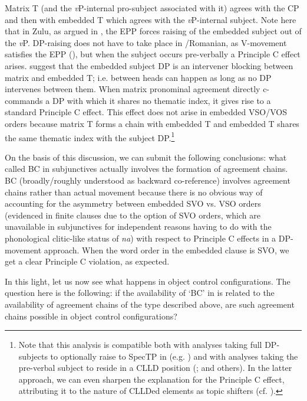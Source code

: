\documentclass[output=paper]{langsci/langscibook}
\begin{document}
Matrix T (and the \textit{v}P-internal pro-subject associated with it) agrees with the CP and then with embedded T which agrees with the \textit{v}P-internal subject. Note here that in Zulu, as argued in \citet{Halpert2016}, the EPP forces raising of the embedded subject out of the \textit{v}P. DP-raising does not have to take place in \slash Romanian, as V-movement satisfies the EPP (\citealt{Alexiadou1998}), but when the subject occurs pre-verbally a Principle C effect arises. \citet{Tsakali2017} suggest that the embedded subject DP is an intervener blocking  between matrix and embedded T; i.e.  between heads can happen as long as no DP intervenes between them. When matrix pronominal agreement directly c-commands a DP with which it shares no thematic index, it gives rise to a standard Principle C effect. This effect does not arise in embedded VSO\slash VOS orders because matrix T forms a chain with embedded T and embedded T shares the same thematic index with the subject DP.\footnote{Note that this analysis is compatible both with analyses taking full DP-subjects to optionally raise to SpecTP in  (e.g. \citealt{Spyropoulos2009}) and with analyses taking the pre-verbal subject to reside in a CLLD position (\citealt{Alexiadou1998}; \citealt{Barbosa2009} and others). In the latter approach, we can even sharpen the explanation for the Principle C effect, attributing it to the nature of CLLDed elements as topic shifters (cf. \citealt{Frascarelli2007}).}   

On the basis of this discussion, we can submit the following conclusions: what \citet{Alexiadou2010} called BC in subjunctives actually involves the formation of agreement chains. BC (broadly\slash roughly understood as backward co-reference) involves agreement chains rather than actual movement because there is no obvious way of accounting for the asymmetry between embedded SVO vs. VSO orders (evidenced in finite clauses due to the option of SVO orders, which are unavailable in subjunctives for independent reasons having to do with the phonological clitic-like status of \textit{na}) with respect to Principle C effects in a DP-movement approach. When the word order in the embedded clause is SVO, we get a clear Principle C violation, as expected.

In this light, let us now see what happens in object control configurations. The question here is the following: if the availability of ‘BC’ in  is related to the availability of agreement chains of the type described above, are such agreement chains possible in object control configurations?
\end{document}
